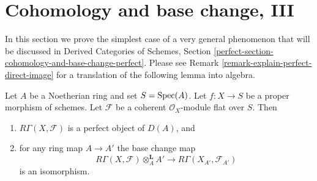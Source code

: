 \section{Cohomology and base change, III}
\label{section-cohomology-and-base-change-perfect}

\noindent
In this section we prove the simplest case of a very general phenomenon
that will be discussed in
Derived Categories of Schemes, Section
\ref{perfect-section-cohomology-and-base-change-perfect}.
Please see Remark \ref{remark-explain-perfect-direct-image} for a translation
of the following lemma into algebra.

\begin{lemma}
\label{lemma-perfect-direct-image}
Let $A$ be a Noetherian ring and set $S = \mathop{\mathrm{Spec}}(A)$. Let $f : X \to S$ be a
proper morphism of schemes. Let $\mathcal{F}$ be a coherent
$\mathcal{O}_X$-module flat over $S$. Then
\begin{enumerate}
\item $R\Gamma(X, \mathcal{F})$ is a perfect object of $D(A)$, and
\item for any ring map $A \to A'$ the base change map
$$
R\Gamma(X, \mathcal{F}) \otimes_A^{\mathbf{L}} A'
\longrightarrow
R\Gamma(X_{A'}, \mathcal{F}_{A'})
$$
is an isomorphism.
\end{enumerate}
\end{lemma}

